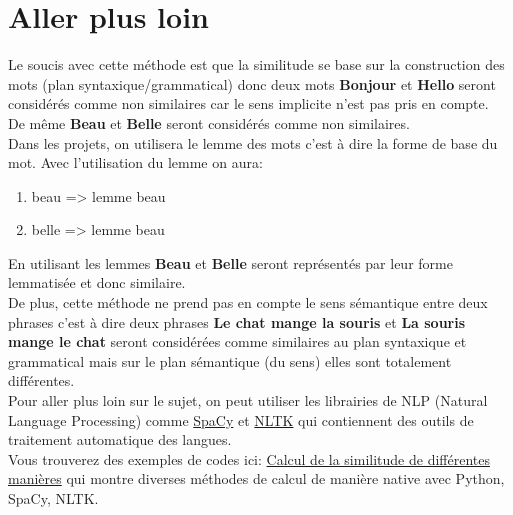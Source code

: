 \documentclass[a4paper, 14pt]{article}
\begin{document}
    \section{Aller plus loin}
    Le soucis avec cette méthode est que la similitude se base sur la construction des mots (plan syntaxique/grammatical) donc deux mots \textbf{Bonjour} et \textbf{Hello} seront considérés comme non similaires car le sens implicite n'est pas pris en compte.\\
    De même \textbf{Beau} et \textbf{Belle} seront considérés comme non similaires.\\
    Dans les projets, on utilisera le lemme des mots c'est à dire la forme de base du mot. Avec l'utilisation du lemme on aura:
    \begin{enumerate}
    	\item[\textbullet] beau => lemme beau
    	\item[\textbullet] belle => lemme beau
    \end{enumerate}
    En utilisant les lemmes \textbf{Beau} et \textbf{Belle} seront représentés par leur forme lemmatisée et donc similaire.\\
    De plus, cette méthode ne prend pas en compte le sens sémantique entre deux phrases c'est à dire deux phrases \textbf{Le chat mange la souris} et \textbf{La souris mange le chat} seront considérées comme similaires au plan syntaxique et grammatical mais sur le plan sémantique (du sens) elles sont totalement différentes.\\
    Pour aller plus loin sur le sujet, on peut utiliser les librairies de NLP (Natural Language Processing) comme \href{https://spacy.io/}{SpaCy} et \href{https://www.nltk.org/}{NLTK} qui contiennent des outils de traitement automatique des langues.\\
	Vous trouverez des exemples de codes ici: \href{https://github.com/tisma95/articles/tree/master/cosine-similarity/sentence-similarities-benchmark}{Calcul de la similitude de différentes manières} qui montre diverses méthodes de calcul de manière native avec Python, SpaCy, NLTK.
\end{document}
